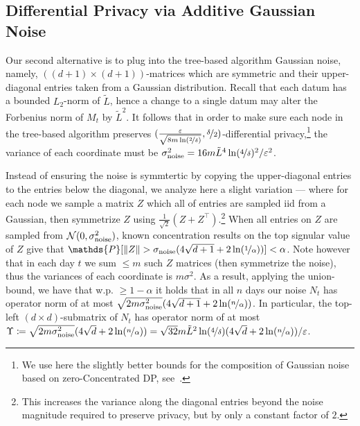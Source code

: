 \documentclass{article}
\newcommand{\defeq}{\coloneq}
\renewcommand{\Pr}{\mathds{P}}
\providecommand\transp{\top}
\let\transpsymbol\transp
\renewcommand{\transp}[1]{#1^\transpsymbol}
\newcommand{\Normal}{\mathcal{N}}
\begin{document}
\subsection{Differential Privacy via Additive Gaussian Noise}
\label{sec:dp-gauss}

Our second alternative is to plug into the tree-based algorithm Gaussian noise, namely, $\left((d+1)\times (d+1)\right)$-matrices which are symmetric and their upper-diagonal entries taken from a Gaussian distribution. Recall that each datum has a bounded $L_2$-norm of $\tilde L$, hence a change to a single datum may alter the Forbenius norm of $M_t$ by $\tilde L^2$. It follows that in order to make sure each node in the tree-based algorithm  preserves $(\tfrac{\varepsilon}{\sqrt{8m\ln(\nicefrac{2}{\delta})}}, \nicefrac{\delta}{2})$-differential privacy,\footnote{We use here the slightly better bounds for the composition of Gaussian noise based on zero-Concentrated DP, see~\cite{BunSteinke2016}.} the variance of each coordinate must be $\sigma_{\rm noise}^2 = 16m\tilde L ^4 \ln(\nicefrac 4 \delta)^2 / \varepsilon^2$.

Instead of ensuring the noise is symmtertic by copying the upper-diagonal entries to the entries below the diagonal, we analyze here a slight variation --- where for each node we sample a matrix $Z$ which all of entries are sampled iid from a Gaussian, then symmetrize $Z$ using $\tfrac 1 {\sqrt 2}(Z+\transp{Z})$.\footnote{This increases the variance along the diagonal entries beyond the noise magnitude required to preserve privacy, but by only a constant factor of $2$.} When all entries on $Z$ are sampled from $\Normal(0,\sigma_{\rm noise}^2)$, known concentration results on the top signular value of $Z$ give that $\Pr[ \|Z\| > \sigma_{\rm noise}(4\sqrt{d+1} + 2\ln(\nicefrac 1 \alpha)) ] < \alpha$. Note however that in each day $t$ we sum $\leq m$ such $Z$ matrices (then symmetrize the noise), thus the variances of each coordinate is $m\sigma^2$. As a result, applying the union-bound, we have that w.p. $\geq 1-\alpha$ it holds that in all $n$ days our noise $N_t$ has operator norm of at most $\sqrt{2m\sigma_{\rm noise}^2}(4\sqrt{d+1} + 2\ln(\nicefrac n \alpha))$. In particular, the top-left $(d\times d)$-submatrix of $N_t$ has operator norm of at most $\Upsilon \defeq \sqrt{2m\sigma_{\rm noise}^2}(4\sqrt{d} + 2\ln(\nicefrac n \alpha)) = \sqrt{32} m\tilde L ^2 \ln(\nicefrac 4 \delta)(4\sqrt{d} + 2\ln(\nicefrac n \alpha)) / \varepsilon$.
\end{document}
